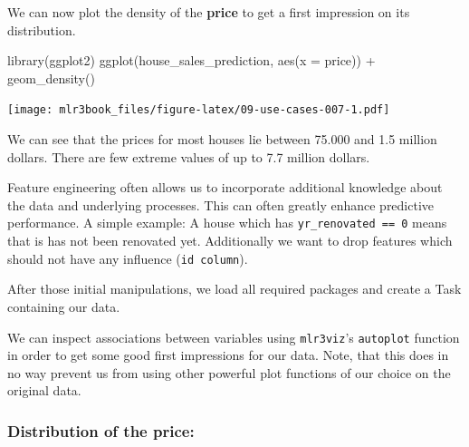 \documentclass[12pt,]{scrbook}
\newenvironment{Shaded}{}{}
\newcommand{\DataTypeTok}[1]{#1}
\newcommand{\KeywordTok}[1]{\textcolor[rgb]{0.00,0.00,1.00}{#1}}
\newcommand{\NormalTok}[1]{#1}
\newcommand{\OperatorTok}[1]{#1}
\newcommand{\StringTok}[1]{\textcolor[rgb]{0.00,0.50,0.50}{#1}}
\begin{document}
We can now plot the density of the \textbf{price} to get a first impression on its distribution.

\begin{Shaded}
\begin{Highlighting}[]
\KeywordTok{library}\NormalTok{(ggplot2)}
\KeywordTok{ggplot}\NormalTok{(house_sales_prediction, }\KeywordTok{aes}\NormalTok{(}\DataTypeTok{x =}\NormalTok{ price)) }\OperatorTok{+}\StringTok{ }\KeywordTok{geom_density}\NormalTok{()}
\end{Highlighting}
\end{Shaded}

\texttt{[image: mlr3book\_files/figure-latex/09-use-cases-007-1.pdf]}

We can see that the prices for most houses lie between 75.000 and 1.5 million dollars.
There are few extreme values of up to 7.7 million dollars.

Feature engineering often allows us to incorporate additional knowledge about the data and underlying processes.
This can often greatly enhance predictive performance.
A simple example: A house which has \texttt{yr\_renovated\ ==\ 0} means that is has not been renovated yet.
Additionally we want to drop features which should not have any influence (\texttt{id\ column}).

After those initial manipulations, we load all required packages and create a Task containing our data.

\begin{Shaded}
\end{Shaded}

We can inspect associations between variables using \texttt{mlr3viz}'s \texttt{autoplot} function in order to get some good first impressions for our data.
Note, that this does in no way prevent us from using other powerful plot functions of our choice on the original data.

\hypertarget{distribution-of-the-price}{%
\subsubsection{Distribution of the price:}\label{distribution-of-the-price}}
\end{document}
